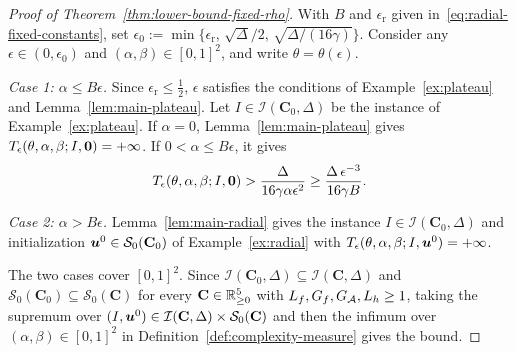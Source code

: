 \begin{proof}[Proof of Theorem~\ref{thm:lower-bound-fixed-rho}]
With \(B\) and \(\epsilon_\mathrm{r}\) given
in~\eqref{eq:radial-fixed-constants}, set
\(\epsilon_0:=\min\{\epsilon_\mathrm{r},\,\sqrt{\Delta}/2,\,\sqrt{\Delta/(16\gamma)}\}\).
Consider any \(\epsilon\in(0,\epsilon_0)\) and \((\alpha,\beta)\in[0,1]^2\), and
write \(\theta=\theta(\epsilon)\).

\emph{Case 1: \(\alpha\le B\epsilon\).} Since \(\epsilon_\mathrm{r}\le\frac12\),
\(\epsilon\) satisfies the conditions of Example~\ref{ex:plateau} and
Lemma~\ref{lem:main-plateau}. Let \(I\in\mathcal I(\mathbf C_0,\Delta)\) be the
instance of Example~\ref{ex:plateau}. If \(\alpha=0\),
Lemma~\ref{lem:main-plateau} gives
\(T_\epsilon(\theta,\alpha,\beta;I,\bm{0})=+\infty\). If
\(0<\alpha\le B\epsilon\), it gives
\[
    T_\epsilon(\theta,\alpha,\beta;I,\bm{0})
    >\frac{\Delta}{16\gamma\alpha\epsilon^2}
    \ge\frac{\Delta\,\epsilon^{-3}}{16\gamma B}.
\]

\emph{Case 2: \(\alpha>B\epsilon\).} Lemma~\ref{lem:main-radial} gives the
instance \(I\in\mathcal I(\mathbf C_0,\Delta)\) and initialization
\(\bm{u}^0\in\mathcal S_0(\mathbf C_0)\) of Example~\ref{ex:radial} with
\(T_\epsilon(\theta,\alpha,\beta;I,\bm{u}^0)=+\infty\).

The two cases cover \([0,1]^2\). Since
\(\mathcal I(\mathbf C_0,\Delta)\subseteq\mathcal I(\mathbf C,\Delta)\) and
\(\mathcal S_0(\mathbf C_0)\subseteq\mathcal S_0(\mathbf C)\) for every
\(\mathbf C\in\mathbb{R}^5_{\ge0}\) with \(L_f,G_f,G_{\mathcal{A}},L_h\ge1\), taking the
supremum over \((I,\bm{u}^0)\in\mathcal I(\mathbf C,\Delta)\times\mathcal S_0(\mathbf C)\)
and then the infimum over \((\alpha,\beta)\in[0,1]^2\) in
Definition~\ref{def:complexity-measure} gives the bound.
\end{proof}

